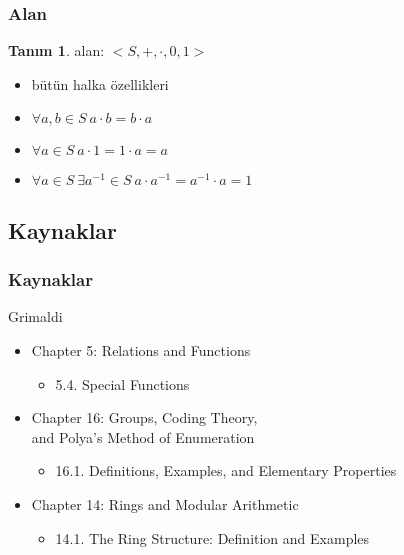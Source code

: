 \documentclass[dvipsnames]{beamer}
\theoremstyle{definition}
\newtheorem{tanim}[theorem]{Tanım}
\theoremstyle{example}
\theoremstyle{plain}
\begin{document}
\begin{frame}
  \frametitle{Alan}

  \begin{tanim}
    \alert{alan}: $<S,+,\cdot,0,1>$
    \begin{itemize}
      \item bütün halka özellikleri

      \pause
      \item $\forall a,b \in S~a \cdot b = b \cdot a$
      \item $\forall a \in S~a \cdot 1 = 1 \cdot a = a$
      \item $\forall a \in S~\exists a^{-1} \in S~a \cdot a^{-1} = a^{-1} \cdot a = 1$
    \end{itemize}
  \end{tanim}
\end{frame}

\subsection*{Kaynaklar}

\begin{frame}
  \frametitle{Kaynaklar}

  \begin{block}{Grimaldi}
    \begin{itemize}
      \item Chapter 5: Relations and Functions
      \begin{itemize}
        \item 5.4. \alert{Special Functions}
      \end{itemize}

      \item Chapter 16: Groups, Coding Theory,\\
        and Polya's Method of Enumeration
      \begin{itemize}
        \item 16.1. \alert{Definitions, Examples, and Elementary Properties}
      \end{itemize}

      \item Chapter 14: Rings and Modular Arithmetic
      \begin{itemize}
        \item 14.1. \alert{The Ring Structure: Definition and Examples}
      \end{itemize}
    \end{itemize}
  \end{block}
\end{frame}
\end{document}
